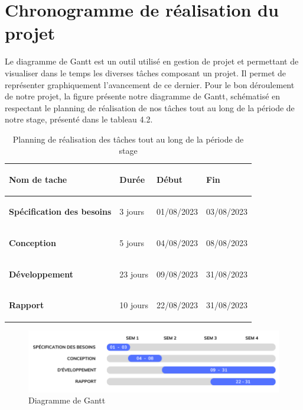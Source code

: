 \documentclass[12pt]{report}
\begin{document}
\section{Chronogramme de réalisation du projet}
Le diagramme de Gantt est un outil utilisé en gestion de projet et permettant de visualiser dans le temps les diverses tâches composant un projet. Il permet de représenter graphiquement l'avancement de ce dernier.
Pour le bon déroulement de notre projet, la figure présente notre diagramme de Gantt, schématisé en respectant le planning de réalisation de nos tâches tout au long de la période de notre stage, présenté dans le tableau 4.2.
\begin{table}[H]
\centering
\def\arraystretch{2}
\begin{tabular}{|p{5cm}|p{3.5cm}|p{3.5cm}|p{3.5cm}|}
   \hline
   \begin{large}
    \textbf{Nom de tache}
   \end{large} &  
   \begin{large}
    \textbf{Durée}
   \end{large}
   &
   \begin{large}
    \textbf{Début}
   \end{large}
   &
   \begin{large}
    \textbf{Fin}
   \end{large}\\
   \hline
   \begin{large}
    \textbf{Spécification des besoins}
   \end{large} & 3 jours & 01/08/2023 & 03/08/2023\\
   \hline
   \begin{large}
    \textbf{Conception}
   \end{large} & 5 jours & 04/08/2023 & 08/08/2023 \\
   \hline
   \begin{large}
    \textbf{Développement}
   \end{large} & 23 jours & 09/08/2023 & 31/08/2023\\
   \hline
   \begin{large}
    \textbf{Rapport}
   \end{large} & 10 jours & 22/08/2023 & 31/08/2023\\
   \hline
\end{tabular}
\caption{Planning de réalisation des tâches tout au long de la période de stage}
\end{table}
\begin{figure}[H]
  \centering
  \includegraphics[scale=0.8]{gantt3}
  \caption{Diagramme de Gantt}
  \label{fig:votre-label}
\end{figure}
\end{document}
